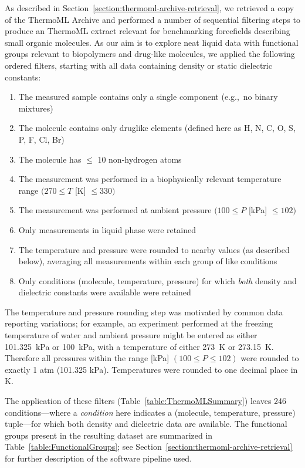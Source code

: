 \documentclass[journal=jacsat,manuscript=article]{achemso}
\begin{document}
As described in Section~\ref{section:thermoml-archive-retrieval}, we retrieved a copy of the ThermoML Archive and performed a number of sequential filtering steps to produce an ThermoML extract relevant for benchmarking forcefields describing small organic molecules.  
As our aim is to explore neat liquid data with functional groups relevant to biopolymers and drug-like molecules, we applied the following ordered filters, starting with all data containing density or static dielectric constants: 
\begin{enumerate}
 \item The measured sample contains only a single component (e.g.,~no binary mixtures)
 \item The molecule contains only druglike elements (defined here as H, N, C, O, S, P, F, Cl, Br)
 \item The molecule has $\le$ 10 non-hydrogen atoms
 \item The measurement was performed in a biophysically relevant temperature range $(270 \le T$ [K] $\le 330)$
 \item The measurement was performed at ambient pressure $(100 \le P$ [kPa]  $\le 102)$
 \item Only measurements in liquid phase were retained
 \item The temperature and pressure were rounded to nearby values (as described below), averaging all measurements within each group of like conditions
 \item Only conditions (molecule, temperature, pressure) for which \emph{both} density and dielectric constants were available were retained
\end{enumerate}
The temperature and pressure rounding step was motivated by common data reporting variations; for example, an experiment performed at the freezing temperature of water and ambient pressure might be entered as either 101.325~kPa or 100~kPa, with a temperature of either 273~K or 273.15~K.  
Therefore all pressures within the range [kPa] $(100 \le P \le 102)$ were rounded to exactly 1 atm (101.325 kPa).  
Temperatures were rounded to one decimal place in K. 

The application of these filters (Table~\ref{table:ThermoMLSummary}) leaves 246 conditions---where a \emph{condition} here indicates a (molecule, temperature, pressure) tuple---for which both density and dielectric data are available.  
The functional groups present in the resulting dataset are summarized in Table~\ref{table:FunctionalGroups}; see Section~\ref{section:thermoml-archive-retrieval} for further description of the software pipeline used.  
\end{document}
